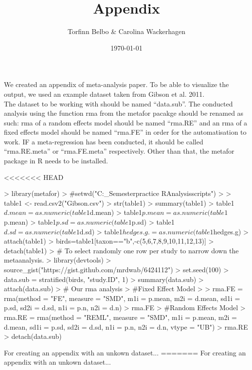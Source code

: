 \documentclass[11pt, a4paper]{article}
\begin{document}
\title{Appendix}
\author{Torfinn Belbo \& Carolina Wackerhagen}

\date{\today}

\maketitle

We created an appendix of meta-analysis paper. To be able to visualize the output, we used an example dataset taken from Gibson et al. 2011.\\ 

The dataset to be working with should be named ``data.sub''. The conducted analysis using the function rma from the metafor pacakge should be renamed as such: rma of a random effects model should be named ``rma.RE'' and an rma of a fixed effects model should be named ``rma.FE'' in order for the automatisation to work. IF a meta-regression has been conducted, it should be called ``rma.RE.meta'' or ``rma.FE.meta'' respectively. Other than that, the metafor package in R needs to be installed.  

<<<<<<< HEAD

\begin{Schunk}
\begin{Sinput}
> library(metafor)
> #setwd("C:\Users\ICI\Documents\Carolina\Uni\Freiburg\3_Semester\Best practice R\Meta Analysis\R scripts")
> 
> table1 <- read.csv2("Gibson.csv")
> str(table1)
> summary(table1) 
> table1$d.mean=as.numeric(table1$d.mean)
> table1$p.mean=as.numeric(table1$p.mean)
> table1$p.sd=as.numeric(table1$p.sd)
> table1$d.sd=as.numeric(table1$d.sd)
> table1$hedges.g.=as.numeric(table1$hedges.g)
> attach(table1)
> birds=table1[taxon=="b",-c(5,6,7,8,9,10,11,12,13)]
> detach(table1)
> # To select randomly one row per study to narrow down the metaanalysis.
> library(devtools)
> source_gist("https://gist.github.com/mrdwab/6424112")
> set.seed(100) 
> data.sub = stratified(birds, "study.ID", 1)
> summary(data.sub)
> attach(data.sub)
> # Our rma analysis
> #Fixed Effect Model
> 
> rma.FE = rma(method = "FE", measure = "SMD", m1i = p.mean, m2i = d.mean, sd1i = p.sd, sd2i = d.sd, n1i = p.n, n2i = d.n)
> rma.FE
> #Random Effects Model
> rma.RE = rma(method = "REML", measure = "SMD", m1i = p.mean, m2i = d.mean, sd1i = p.sd, sd2i = d.sd, n1i = p.n, n2i = d.n, vtype = "UB")
> rma.RE
> detach(data.sub)
\end{Sinput}
\end{Schunk}

For creating an appendix with an unkown dataset... 
=======
For creating an appendix with an unkown dataset... 
\end{document}
